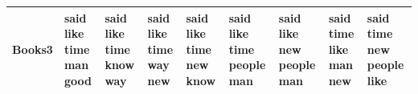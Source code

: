 \documentclass[11pt,a4paper]{article}
\begin{document}
\begin{appendices}
\begin{table}[htb]
\begin{tiny}
\begin{tabular}{|p{}|p{}|p{}|p{}|p{}|p{}|p{}|p{}|p{}|}
    Books3 & said \newline like \newline time \newline man \newline good & said \newline like \newline time \newline know \newline way & said \newline like \newline time \newline way \newline new & said \newline like \newline time \newline new \newline know & said \newline like \newline time \newline people \newline man & said \newline like \newline new \newline people \newline man & said \newline time \newline like \newline man \newline new & said \newline time \newline new \newline people \newline like\\\hline

\end{tabular}
\end{tiny}
\end{table}
\end{appendices}
\end{document}
